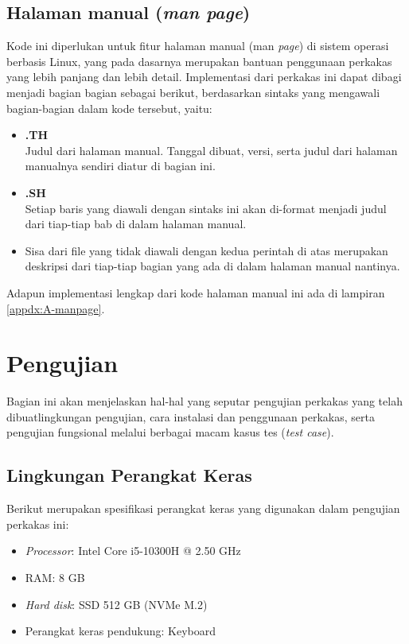 \subsection{Halaman manual (\textit{man page})}
\label{sec:testing-implementation-man}

Kode ini diperlukan untuk fitur halaman manual (man \textit{page}) di sistem operasi berbasis Linux, yang pada dasarnya merupakan bantuan penggunaan perkakas yang lebih panjang dan lebih detail. Implementasi dari perkakas ini dapat dibagi menjadi bagian bagian sebagai berikut, berdasarkan sintaks yang mengawali bagian-bagian dalam kode tersebut, yaitu:

\begin{itemize}
	\item \textbf{.TH} \\
	Judul dari halaman manual. Tanggal dibuat, versi, serta judul dari halaman manualnya sendiri diatur di bagian ini.
	\item \textbf{.SH} \\
	Setiap baris yang diawali dengan sintaks ini akan di-format menjadi judul dari tiap-tiap bab di dalam halaman manual.
	\item Sisa dari file yang tidak diawali dengan kedua perintah di atas merupakan deskripsi dari tiap-tiap bagian yang ada di dalam halaman manual nantinya.
\end{itemize}
\noindent
Adapun implementasi lengkap dari kode halaman manual ini ada di lampiran \ref{appdx:A-manpage}.

\section{Pengujian}
\label{sec:testing-experiments}

Bagian ini akan menjelaskan hal-hal yang seputar pengujian perkakas yang telah dibuat\textemdash lingkungan pengujian, cara instalasi dan penggunaan perkakas, serta pengujian fungsional melalui berbagai macam kasus tes (\textit{test case}).

\subsection{Lingkungan Perangkat Keras}
\label{sec:testing-experiments-hardware}

Berikut merupakan spesifikasi perangkat keras yang digunakan dalam pengujian perkakas ini:

\begin{itemize}
	\item \textit{Processor}: Intel\logoregistered\xspace Core\logotrademark\xspace i5-10300H @ 2.50 GHz
	\item RAM: 8 GB
	\item \textit{Hard disk}: SSD 512 GB (NVMe\logotrademark\xspace M.2)
	\item Perangkat keras pendukung: Keyboard
\end{itemize}

